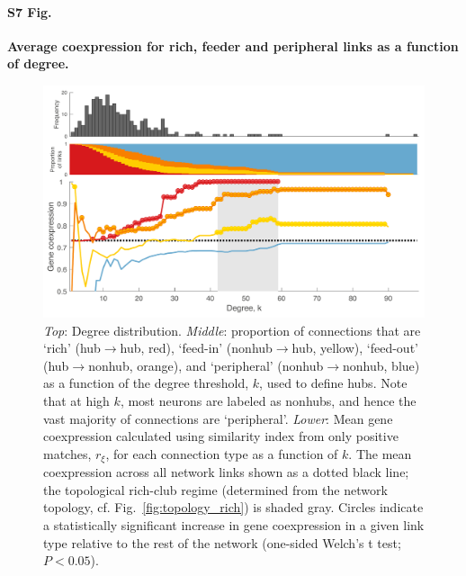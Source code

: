 \documentclass[10pt,letterpaper]{article}
\begin{document}
\paragraph*{S7 Fig.}
{\bf Average coexpression for rich, feeder and peripheral links as a function of degree.}
\begin{figure}[!h]
\label{S7_Fig}
\centering
    \includegraphics[width=1\textwidth]{coXmeanCoexpression.pdf}
\caption{\emph{Top}: Degree distribution.
\emph{Middle}: proportion of connections that are `rich' (hub$\rightarrow$hub, red), `feed-in' (nonhub$\rightarrow$hub, yellow), `feed-out' (hub$\rightarrow$nonhub, orange), and `peripheral' (nonhub$\rightarrow$nonhub, blue) as a function of the degree threshold, $k$, used to define hubs.
Note that at high $k$, most neurons are labeled as nonhubs, and hence the vast majority of connections are `peripheral'.
\emph{Lower}: Mean gene coexpression calculated using similarity index from only positive matches, $r_\xi$, for each connection type as a function of $k$.
The mean coexpression across all network links shown as a dotted black line; the topological rich-club regime (determined from the network topology, cf. Fig.~\ref{fig:topology_rich}) is shaded gray.
Circles indicate a statistically significant increase in gene coexpression in a given link type relative to the rest of the network (one-sided Welch’s t test; $P < 0.05$).}
\end{figure}
\end{document}
